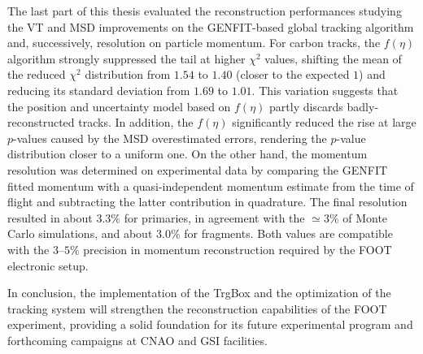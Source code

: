 The last part of this thesis evaluated the reconstruction performances studying the VT and MSD improvements on the GENFIT-based global tracking algorithm and, successively, resolution on particle momentum. For carbon tracks, the $f(\eta)$ algorithm strongly suppressed the tail at higher $\chi^2$ values, shifting the mean of the reduced $\chi^2$ distribution from $1.54$ to $1.40$ (closer to the expected $1$) and reducing its standard deviation from $1.69$ to $1.01$. This variation suggests that the position and uncertainty model based on $f(\eta)$ partly discards badly-reconstructed tracks. In addition, the $f(\eta)$ significantly reduced the rise at large $p$-values caused by the MSD overestimated errors, rendering the $p$-value distribution closer to a uniform one. On the other hand, the momentum resolution was determined on experimental data by comparing the GENFIT fitted momentum with a quasi-independent momentum estimate from the time of flight and subtracting the latter contribution in quadrature. The final resolution resulted in about $3.3\%$ for  primaries, in agreement with the $\simeq 3\%$ of Monte Carlo simulations, and about $3.0\%$ for  fragments. Both values are compatible with the $3$--$5\%$ precision in momentum reconstruction required by the FOOT electronic setup.

In conclusion, the implementation of the TrgBox and the optimization of the tracking system will strengthen the reconstruction capabilities of the FOOT experiment, providing a solid foundation for its future experimental program and forthcoming campaigns at CNAO and GSI facilities.